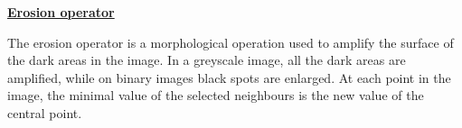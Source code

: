 \documentclass[12pt,a4paper]{article}
\begin{document}
\begin{center}
\textbf{\huge  \underline{Erosion operator}}
\end{center}
\vspace{0.5cm}

The erosion operator is a morphological operation used to amplify the surface of the dark areas in the image. In a greyscale image, all the dark areas are amplified, while on binary images black spots are enlarged.
At each point in the image, the minimal value of the selected neighbours is the new value of the central point.\\


\begin{figure}[h!]
\centering
{}
\end{figure}

\vspace{0.5cm}
\end{document}
